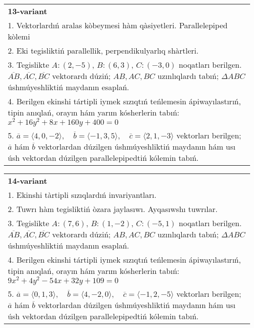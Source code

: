 \documentclass{article}
\begin{document}
\begin{tabular}{m{17cm}}
\textbf{13-variant}\\
1. Vektorlardıń aralas kòbeymesi hàm qàsiyetleri. Parallelepiped kòlemi\\

2. Eki tegisliktiń parallellik, perpendikulyarlıq shàrtleri.\\

3. Tegislikte $A: (2, -5)$, $B: (6, 3)$, $C: (-3, 0)$ noqatları berilgen. $\overline{AB}, \overline{AC}, \overline{BC}$ vektorardı dúziń; $AB, AC, BC$ uzınlıqlardı tabıń; $\Delta ABC$ úshmúyeshliktiń maydanın esaplań. \\

4. Berilgen ekinshi tártipli iymek sızıqtıń teńlemesin ápiwayılastırıń, tipin anıqlań, orayın hám yarım kósherlerin tabıń: $x^2+16y^2+8x+160y+400=0$\\

5. \(\overline{a} = \langle 4, 0, -2 \rangle, \quad \overline{b} = \langle -1, 3, 5 \rangle, \quad \overline{c} = \langle 2, 1, -3 \rangle\) vektorları berilgen; \(\overline{a}\) hám \(\overline{b}\) vektorlardan dúzilgen úshmúyeshliktiń maydanın hám usı úsh vektordan dúzilgen parallelepipedtiń kólemin tabıń.
\end{tabular}
\vspace{1cm}


\begin{tabular}{m{17cm}}
\textbf{14-variant}\\
1. Ekinshi tàrtipli sızıqlardıń invariyantları.\\

2. Tuwrı hàm tegisliktiń òzara jaylasıwı. Ayqasıwshı tuwrılar.\\

3. Tegislikte $A: (7, 6)$, $B: (1, -2)$, $C: (-5, 1)$ noqatları berilgen. $\overline{AB}, \overline{AC}, \overline{BC}$ vektorardı dúziń; $AB, AC, BC$ uzınlıqlardı tabıń; $\Delta ABC$ úshmúyeshliktiń maydanın esaplań. \\

4. Berilgen ekinshi tártipli iymek sızıqtıń teńlemesin ápiwayılastırıń, tipin anıqlań, orayın hám yarım kósherlerin tabıń: $9x^2+4y^2-54x+32y+109=0$\\

5. \(\overline{a} = \langle 0, 1, 3 \rangle, \quad \overline{b} = \langle 4, -2, 0 \rangle, \quad \overline{c} = \langle -1, 2, -5 \rangle\) vektorları berilgen; \(\overline{a}\) hám \(\overline{b}\) vektorlardan dúzilgen úshmúyeshliktiń maydanın hám usı úsh vektordan dúzilgen parallelepipedtiń kólemin tabıń.
\end{tabular}
\vspace{1cm}
\end{document}
